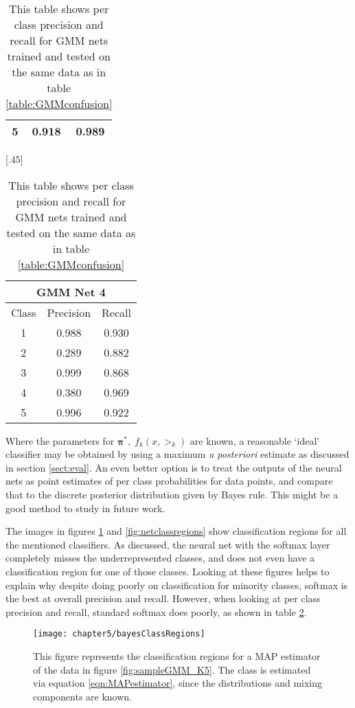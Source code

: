 \begin{table}[ht]
{\begin{tabular}{|c|c|c|}
			5          & 0.918          & 0.989      \\ \hline
		\end{tabular}
	}
	[.45\linewidth]{
		\begin{tabular}{|c|c|c|}
			\hline
			\multicolumn{3}{|c|}{\textbf{GMM Net 4}} \\ \hline
			Class      & Precision      & Recall     \\ \hline
			1          & 0.988          & 0.930      \\ \hline
			2          & 0.289          & 0.882      \\ \hline
			3          & 0.999          & 0.868      \\ \hline
			4          & 0.380          & 0.969      \\ \hline
			5          & 0.996          & 0.922      \\ \hline
		\end{tabular}
	}
	\caption[Per class precision and recall for GMM nets \#1-\#4]{This table shows per class precision and recall for GMM nets trained and tested on the same data as in table \ref{table:GMMconfusion}}\label{table:GMMprecRec}
\end{table}

Where the parameters for \( \bm\pi^{\ast}\!,\; f_k(x,\bm\gt_k) \) are known, a reasonable `ideal' classifier may be obtained by using a maximum \textit{a posteriori} estimate as discussed in section \ref{sect:eval}.  An even better option is to treat the outputs of the neural nets as point estimates of per class probabilities for data points, and compare that to the discrete posterior distribution given by Bayes rule. This might be a good method to study in future work.

The images in figures \ref{fig:bayesclassregions} and \ref{fig:netclassregions} show classification regions for all the mentioned classifiers. As discussed, the neural net with the softmax layer completely misses the underrepresented classes, and does not even have a classification region for one of those classes. Looking at these figures helps to explain why despite doing poorly on classification for minority classes, softmax is the best at overall precision and recall. However, when looking at per class precision and recall, standard softmax does poorly, as shown in table \ref{table:GMMprecRec}.


\begin{figure}[ht]
	\centering
	\texttt{[image: chapter5/bayesClassRegions]}
	\caption[Classification Regions for the MAP classifier 1]{This figure represents the classification regions for a MAP estimator of the data in figure \ref{fig:sampleGMM_K5}. The class is estimated via equation \eqref{eqn:MAPestimator}, since the distributions and mixing components are known. }
	\label{fig:bayesclassregions}
\end{figure}

